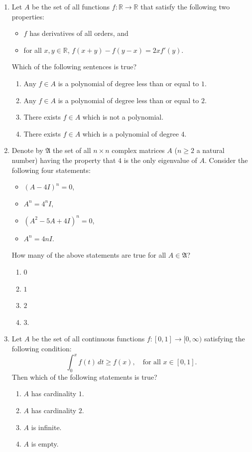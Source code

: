 \documentclass[11pt, a4paper]{article}
\begin{document}
\begin{enumerate}
  \item Let $A$ be the set of all functions $f: \mathbb{R} \to \mathbb{R}$ that satisfy the following two properties:
  \begin{itemize}
    \item $f$ has derivatives of all orders, and
    \item for all $x, y \in \mathbb{R}$, $f(x+y) - f(y-x) = 2x f'(y)$.
  \end{itemize}
  Which of the following sentences is true?
  \begin{enumerate}[label=(\alph*)]
    \item Any $f \in A$ is a polynomial of degree less than or equal to $1$.
    \item Any $f \in A$ is a polynomial of degree less than or equal to $2$.
    \item There exists $f \in A$ which is not a polynomial.
    \item There exists $f \in A$ which is a polynomial of degree $4$.
  \end{enumerate}

  \item Denote by $\mathfrak{A}$ the set of all $n \times n$ complex matrices $A$ ($n \ge 2$ a natural number) having the property that $4$ is the only eigenvalue of $A$. Consider the following four statements:
  \begin{itemize}
    \item $(A - 4I)^n = 0$,
    \item $A^n = 4^n I$,
    \item $(A^2 - 5A + 4I)^n = 0$,
    \item $A^n = 4nI$.
  \end{itemize}
  How many of the above statements are true for all $A \in \mathfrak{A}$?
  \begin{enumerate}[label=(\alph*)]
    \item $0$
    \item $1$
    \item $2$
    \item $3$.
  \end{enumerate}

  \item Let $A$ be the set of all continuous functions $f: [0,1] \to [0,\infty)$ satisfying the following condition:
  \[
    \int_0^x f(t)\,dt \ge f(x), \quad \text{for all } x \in [0,1].
  \]
  Then which of the following statements is true?
  \begin{enumerate}[label=(\alph*)]
    \item $A$ has cardinality $1$.
    \item $A$ has cardinality $2$.
    \item $A$ is infinite.
    \item $A$ is empty.
  \end{enumerate}


\end{enumerate}
\end{document}
